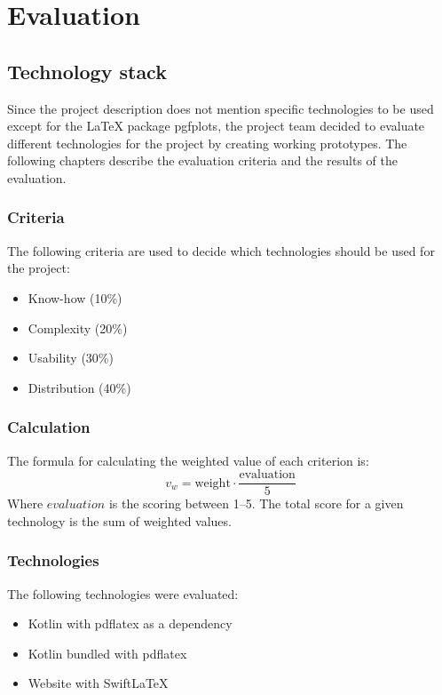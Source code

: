 \section{Evaluation}\label{sec:evaluation}

\subsection{Technology stack}\label{subsec:technology_stack}
Since the project description does not mention specific technologies to be used except for the LaTeX package pgfplots,
the project team decided to evaluate different technologies for the project by creating working prototypes.
The following chapters describe the evaluation criteria and the results of the evaluation.

\subsubsection{Criteria}
The following criteria are used to decide which technologies should be used for the project:
\begin{itemize}
    \item Know-how (10\%)
    \item Complexity (20\%)
    \item Usability (30\%)
    \item Distribution (40\%)
\end{itemize}

\subsubsection{Calculation}
The formula for calculating the weighted value of each criterion is:
\[
    v_w = \text{weight} \cdot \frac{\text{evaluation}}{5}
\]
Where \(evaluation\) is the scoring between 1--5.
The total score for a given technology is the sum
of weighted values.

\subsubsection{Technologies}
The following technologies were evaluated:
\begin{itemize}
    \item Kotlin with pdflatex as a dependency
    \item Kotlin bundled with pdflatex
    \item Website with SwiftLaTeX
\end{itemize}

